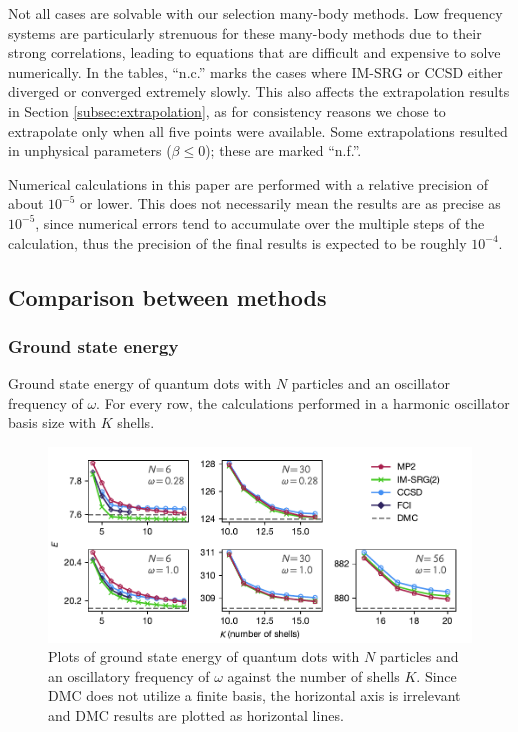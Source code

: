 Not all cases are solvable with our selection many-body methods.  Low frequency systems are particularly strenuous for these many-body methods due to their strong correlations, leading to equations that are difficult and expensive to solve numerically.  In the tables, ``n.c.'' marks the cases where IM-SRG or CCSD either diverged or converged extremely slowly.  This also affects the extrapolation results in Section \ref{subsec:extrapolation}, as for consistency reasons we chose to extrapolate only when all five points were available.  Some extrapolations resulted in unphysical parameters ($\beta \le 0$); these are marked ``n.f.''.

Numerical calculations in this paper are performed with a relative precision of about $10^{-5}$ or lower.  This does not necessarily mean the results are as precise as $10^{-5}$, since numerical errors tend to accumulate over the multiple steps of the calculation, thus the precision of the final results is expected to be roughly $10^{-4}$.

\subsection{Comparison between methods}

\subsubsection{Ground state energy}

\begin{table}
  \centering
  \caption{Ground state energy of quantum dots with $N$ particles and an oscillator frequency of $\omega$.  For every row, the calculations performed in a harmonic oscillator basis size with $K$ shells.}
  \label{tab:ground}
  
\end{table}

\begin{figure}
  \centering
  \includegraphics{fig-gs2.pdf}
  \caption{Plots of ground state energy of quantum dots with $N$ particles and an oscillatory frequency of $\omega$ against the number of shells $K$.  Since DMC does not utilize a finite basis, the horizontal axis is irrelevant and DMC results are plotted as horizontal lines.}
  \label{fig:gs}
\end{figure}

